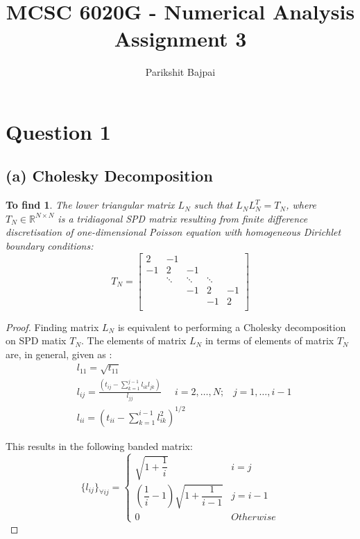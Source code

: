 \documentclass[11pt, oneside]{article}
\title{MCSC 6020G - Numerical Analysis \\
        \Large Assignment 3}
\author{Parikshit Bajpai}
\date{}
\newtheorem*{remark}{To find}
\begin{document}
\maketitle

\section*{Question 1}
\subsection{(a) Cholesky Decomposition}
	\begin{remark}
		The lower triangular matrix $L_N$ such that $L_N L_N^T = T_N$, where $T_N \in \mathbb{R}^{N \times N}$ is a tridiagonal SPD matrix resulting from finite difference discretisation of one-dimensional Poisson equation with homogeneous Dirichlet boundary conditions:
    \begin{equation}
      T_N = \begin{bmatrix}
      2 	& -1 		&  		&  		& \\
      -1 	& 2 		& -1 		&  		& \\
       	& \ddots 	& \ddots 	& \ddots 	& \\
       	&  		& -1	 	& 2 		& -1 \\
       	&  		&  		& -1 		& 2 \\
    \end{bmatrix}
    \end{equation}
	\end{remark}
	\begin{proof}
		Finding matrix $L_N$ is equivalent to performing a Cholesky decomposition on SPD matix $T_N$. The elements of matrix $L_N$ in terms of elements of matrix $T_N$ are, in general, given as \cite{quarteroni2017}:
    \begin{align}
      &l_{11} = \sqrt{t_{11}} \\
      &l_{ij} = \frac{\left(t_{ij} - \sum_{k=1}^{j-1} l_{ik} l_{jk} \right)}{l_{jj}} \mspace{25mu} i = 2, \dots, N;  \mspace{15mu} j = 1, \dots, i-1 \\
      &l_{ii} = \left(t_{ii} - \sum_{k=1}^{i-1} l_{ik}^2 \right)^{1/2}
    \end{align}

    This results in the following banded matrix:
    \begin{equation}\label{Generic_LN}
      \{l_{ij}\}_{\forall ij} = \begin{cases}
            \sqrt{1+\dfrac{1}{i}} & i=j\\
            \left(\dfrac{1}{i}-1\right)\sqrt{1+\dfrac{1}{i-1}} & j=i-1\\
            0 & Otherwise
          \end{cases}
      \end{equation} \qedhere
      \end{proof}
\end{document}

